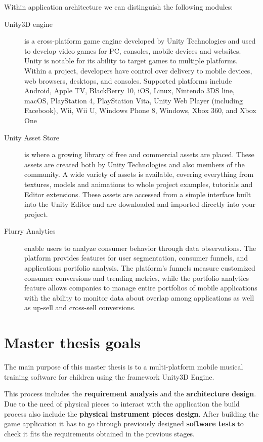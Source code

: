 Within application architecture we can distinguish the following modules:

\begin{description}

\item[Unity3D engine] is a cross-platform game engine developed by Unity Technologies and used to develop video games for PC, consoles, mobile devices and websites. Unity is notable for its ability to target games to multiple platforms. Within a project, developers have control over delivery to mobile devices, web browsers, desktops, and consoles. Supported platforms include Android, Apple TV, BlackBerry 10, iOS, Linux, Nintendo 3DS line, macOS, PlayStation 4, PlayStation Vita, Unity Web Player (including Facebook), Wii, Wii U, Windows Phone 8, Windows, Xbox 360, and Xbox One

\item[Unity Asset Store] is where a growing library of free and commercial assets are placed. These assets are created both by Unity Technologies and also members of the community. A wide variety of assets is available, covering everything from textures, models and animations to whole project examples, tutorials and Editor extensions. These assets are accessed from a simple interface built into the Unity Editor and are downloaded and imported directly into your project.

\item[Flurry Analytics] enable users to analyze consumer behavior through data observations. The platform provides features for user segmentation, consumer funnels, and applications portfolio analysis. The platform's funnels measure customized consumer conversions and trending metrics, while the portfolio analytics feature allows companies to manage entire portfolios of mobile applications with the ability to monitor data about overlap among applications as well as up-sell and cross-sell conversions.

\end{description}

\section{Master thesis goals}
\label{sec:masterthesisgoals}

The main purpose of this master thesis is to a multi-platform mobile musical training software for children using the framework Unity3D Engine.

This process includes the \textbf{requirement analysis} and the \textbf{architecture design}. Due to the need of physical pieces to interact with the application the build process also include the \textbf{physical instrument pieces design}. After building the game application it has to go through previously designed \textbf{software tests} to check it fits the requirements obtained in the previous stages.

